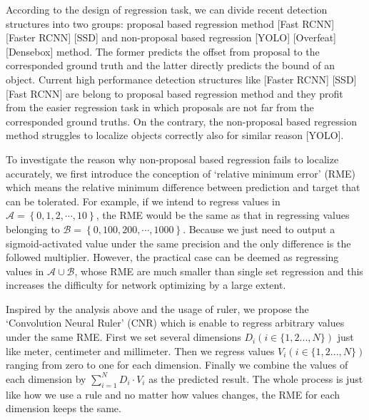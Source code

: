 \documentclass[10pt,twocolumn,letterpaper]{article}
\begin{document}
	According to the design of regression task, we can divide recent detection structures into two groups: proposal based regression method [Fast RCNN] [Faster RCNN] [SSD] and non-proposal based regression [YOLO] [Overfeat] [Densebox] method. 
	The former predicts the offset from proposal to the corresponded ground truth and the latter directly predicts the bound of an object. Current high performance detection structures like [Faster RCNN] [SSD] [Fast RCNN] are belong to proposal based regression method and they profit from the easier regression task in which proposals are not far from the corresponded ground truths. On the contrary, the non-proposal based regression method struggles to localize objects correctly also for similar reason [YOLO].


	To investigate the reason why non-proposal based regression fails to localize accurately, we first introduce the conception of `relative minimum error' (RME) which means the relative minimum difference between prediction and target that can be tolerated. For example, if we intend to regress values in $\mathcal{A} = \left\{0, 1, 2, \cdots, 10\right\}$, the RME would be the same as that in regressing values belonging to $\mathcal{B} = \left\{0, 100, 200, \cdots, 1000\right\}$. Because we just need to output a sigmoid-activated value under the same precision and the only difference is the followed multiplier. However, the practical case can be deemed as regressing values in $\mathcal{A} \cup \mathcal{B}$, whose RME are much smaller than single set regression and this increases the difficulty for network optimizing by a large extent.
	
	Inspired by the analysis above and the usage of ruler, we propose the `Convolution Neural Ruler' (CNR) which is enable to regress arbitrary values under the same RME. 
	First we set several dimensions $D_i (i\in \{1, 2 ..., N\})$ just like meter, centimeter and millimeter. Then we regress values $V_i (i\in \{1, 2 ..., N\})$ ranging from zero to one for each dimension. Finally we combine the values of each dimension by $\sum_{i = 1}^{N} D_{i} \cdot V_{i}$ as the predicted result. The whole process is just like how we use a rule and no matter how values changes, the RME for each dimension keeps the same.
	
\end{document}
